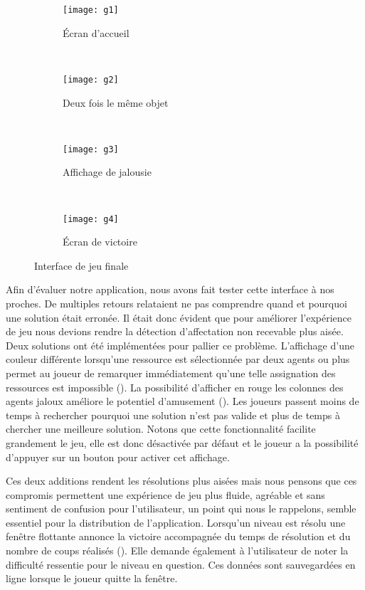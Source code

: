 \documentclass[../main.tex]{subfiles}
\begin{document}
\begin{figure}[ht!]
    \centering
    \begin{subfigure}{0.34\textwidth}
        \centering
        \texttt{[image: g1]}
        \caption{Écran d'accueil}
        \label{fig-finalgameview}
    \end{subfigure}
    ~
    \begin{subfigure}{0.34\textwidth}
        \centering
        \texttt{[image: g2]}
        \caption{Deux fois le même objet}
        \label{fig-twotimes}
   \end{subfigure}
    ~
    \begin{subfigure}{0.34\textwidth}
        \centering
        \texttt{[image: g3]}
        \caption{Affichage de jalousie}
        \label{fig-envy}
    \end{subfigure}
    ~
    \begin{subfigure}{0.34\textwidth}
        \centering
        \texttt{[image: g4]}
        \caption{Écran de victoire}
        \label{fig-victory}
    \end{subfigure}
    \caption{Interface de jeu finale}
\end{figure}

    Afin d'évaluer notre application, nous avons fait tester cette interface à nos proches. De multiples retours relataient ne pas comprendre quand et pourquoi une solution était erronée. Il était donc évident que pour améliorer l'expérience de jeu nous devions rendre la détection d'affectation non recevable plus aisée. Deux solutions ont été implémentées pour pallier ce problème. L'affichage d'une couleur différente lorsqu'une ressource est sélectionnée par deux agents ou plus permet au joueur de remarquer immédiatement qu'une telle assignation des ressources est impossible (). La possibilité d'afficher en rouge les colonnes des agents jaloux améliore le potentiel d'amusement (). Les joueurs passent moins de temps à rechercher pourquoi une solution n'est pas valide et plus de temps à chercher une meilleure solution. Notons que cette fonctionnalité facilite grandement le jeu, elle est donc désactivée par défaut et le joueur a la possibilité d'appuyer sur un bouton pour activer cet affichage.

    Ces deux additions rendent les résolutions plus aisées mais nous pensons que ces compromis permettent une expérience de jeu plus fluide, agréable et sans sentiment de confusion pour l'utilisateur, un point qui nous le rappelons, semble essentiel pour la distribution de l'application. Lorsqu'un niveau est résolu une fenêtre flottante annonce la victoire accompagnée du temps de résolution et du nombre de coups réalisés (). Elle demande également à l'utilisateur de noter la difficulté ressentie pour le niveau en question. Ces données sont sauvegardées en ligne lorsque le joueur quitte la fenêtre.
    
\end{document}
